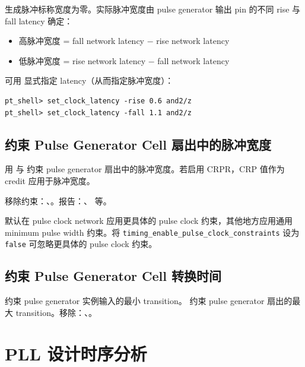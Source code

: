 生成脉冲标称宽度为零。实际脉冲宽度由 pulse generator 输出 pin 的不同 rise 与 fall latency 确定：
\begin{itemize}
  \item 高脉冲宽度 = fall network latency $-$ rise network latency
  \item 低脉冲宽度 = rise network latency $-$ fall network latency
\end{itemize}

可用  显式指定 latency（从而指定脉冲宽度）：
\begin{lstlisting}
pt_shell> set_clock_latency -rise 0.6 and2/z
pt_shell> set_clock_latency -fall 1.1 and2/z
\end{lstlisting}

\subsection{约束 Pulse Generator Cell 扇出中的脉冲宽度}
用  与  约束 pulse generator 扇出中的脉冲宽度。若启用 CRPR，CRP 值作为 credit 应用于脉冲宽度。


移除约束：、。报告：、 等。

默认在 pulse clock network 应用更具体的 pulse clock 约束，其他地方应用通用 minimum pulse width 约束。将 \texttt{timing\_enable\_pulse\_clock\_constraints} 设为 \texttt{false} 可忽略更具体的 pulse clock 约束。

\subsection{约束 Pulse Generator Cell 转换时间}
 约束 pulse generator 实例输入的最小 transition。 约束 pulse generator 扇出的最大 transition。移除：、。

\section{PLL 设计时序分析}
